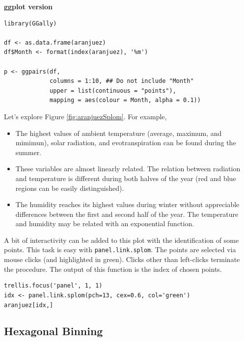 \documentclass[smallroyalvopaper]{memoir}
\begin{document}
\textbf{ggplot version}

\lstset{language=r,label= ,caption= ,captionpos=b,numbers=none}
\begin{lstlisting}
library(GGally)

df <- as.data.frame(aranjuez)
df$Month <- format(index(aranjuez), '%m')
 
p <- ggpairs(df,
             columns = 1:10, ## Do not include "Month"
             upper = list(continuous = "points"),
             mapping = aes(colour = Month, alpha = 0.1))
\end{lstlisting}

Let's explore Figure \ref{fig:aranjuezSplom}. For example,
\begin{itemize}
\item The highest values of ambient temperature (average, maximum, and
mimimun), solar radiation, and evotranspiration can be found
during the summer.
\item These variables are almost linearly related. The relation
between radiation and temperature is different during both
halves of the year (red and blue regions can be easily distinguished).
\item The humidity reaches its highest values during winter without
appreciable differences between the first and second half of the
year. The temperature and humidity may be related with an
exponential function.
\end{itemize}

A bit of interactivity can be added to this plot with the
identification of some points. This task is easy with
\texttt{panel.link.splom}. The points are selected via mouse clicks (and
highlighted in green). Clicks other than left-clicks terminate the
procedure. The output of this function is the index of chosen
points.


\lstset{language=r,label= ,caption= ,captionpos=b,numbers=none}
\begin{lstlisting}
trellis.focus('panel', 1, 1)
idx <- panel.link.splom(pch=13, cex=0.6, col='green')
aranjuez[idx,]
\end{lstlisting}


\subsection{Hexagonal Binning \label{SEC:hexbin}}
\label{sec:orgbb598f3}
\end{document}
